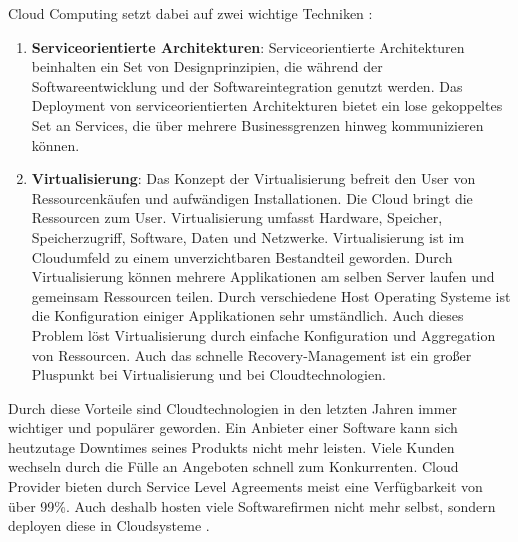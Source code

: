Cloud Computing setzt dabei auf zwei wichtige Techniken \cite{CloudComputing}:
\begin{enumerate}
	\item \textbf{Serviceorientierte Architekturen}: Serviceorientierte Architekturen beinhalten ein Set von Designprinzipien, die während der Softwareentwicklung und der Softwareintegration genutzt werden. Das Deployment von serviceorientierten Architekturen bietet ein lose gekoppeltes Set an Services, die über mehrere Businessgrenzen hinweg kommunizieren können.
	\item \textbf{Virtualisierung}: Das Konzept der Virtualisierung befreit den User von Ressourcenkäufen und aufwändigen Installationen. Die Cloud bringt die Ressourcen zum User. Virtualisierung umfasst Hardware, Speicher, Speicherzugriff, Software, Daten und Netzwerke. Virtualisierung ist im Cloudumfeld zu einem unverzichtbaren Bestandteil geworden. Durch Virtualisierung können mehrere Applikationen am selben Server laufen und gemeinsam Ressourcen teilen. Durch verschiedene Host Operating Systeme ist die Konfiguration einiger Applikationen sehr umständlich. Auch dieses Problem löst Virtualisierung durch einfache Konfiguration und Aggregation von Ressourcen. Auch das schnelle Recovery-Management ist ein großer Pluspunkt bei Virtualisierung und bei Cloudtechnologien.
\end{enumerate}

Durch diese Vorteile sind Cloudtechnologien in den letzten Jahren immer wichtiger und populärer geworden. Ein Anbieter einer Software kann sich heutzutage Downtimes seines Produkts nicht mehr leisten. Viele Kunden wechseln durch die Fülle an Angeboten schnell zum Konkurrenten. Cloud Provider bieten durch Service Level Agreements meist eine Verfügbarkeit von über 99\%. Auch deshalb hosten viele Softwarefirmen nicht mehr selbst, sondern deployen diese in Cloudsysteme \cite{CloudComputing}.

